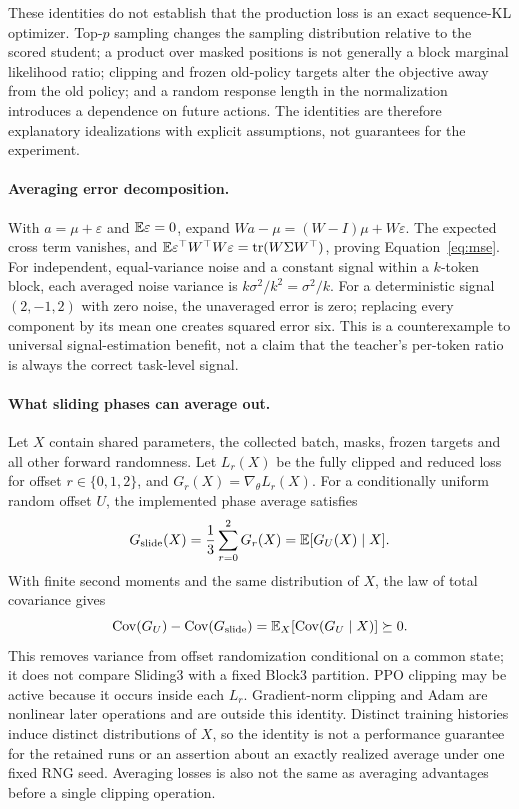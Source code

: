 These identities do not establish that the production loss is an exact sequence-KL optimizer. Top-$p$ sampling changes the sampling distribution relative to the scored student; a product over masked positions is not generally a block marginal likelihood ratio; clipping and frozen old-policy targets alter the objective away from the old policy; and a random response length in the normalization introduces a dependence on future actions. The identities are therefore explanatory idealizations with explicit assumptions, not guarantees for the experiment.

\paragraph{Averaging error decomposition.}
With $a=\mu+\varepsilon$ and $\mathbb{E}\varepsilon=0$, expand $Wa-\mu=(W-I)\mu+W\varepsilon$.
The expected cross term vanishes, and $\mathbb{E}\varepsilon^\top W^\top W\varepsilon=\operatorname{tr}(W\Sigma W^\top)$, proving Equation~\ref{eq:mse}.
For independent, equal-variance noise and a constant signal within a $k$-token block, each averaged noise variance is $k\sigma^2/k^2=\sigma^2/k$.
For a deterministic signal $(2,-1,2)$ with zero noise, the unaveraged error is zero; replacing every component by its mean one creates squared error six. This is a counterexample to universal signal-estimation benefit, not a claim that the teacher's per-token ratio is always the correct task-level signal.

\paragraph{What sliding phases can average out.}
Let $X$ contain shared parameters, the collected batch, masks, frozen targets and all other forward randomness. Let $L_r(X)$ be the fully clipped and reduced loss for offset $r\in\{0,1,2\}$, and $G_r(X)=\nabla_\theta L_r(X)$. For a conditionally uniform random offset $U$, the implemented phase average satisfies
\begin{equation}
 G_{\mathrm{slide}}(X)=\frac13\sum_{r=0}^2G_r(X)
 =\mathbb{E}[G_U(X)\mid X].
\end{equation}
With finite second moments and the same distribution of $X$, the law of total covariance gives
\begin{equation}
 \operatorname{Cov}(G_U)-\operatorname{Cov}(G_{\mathrm{slide}})
 =\mathbb{E}_X[\operatorname{Cov}(G_U\mid X)]\succeq0.
 \label{eq:phasecov}
\end{equation}
This removes variance from offset randomization conditional on a common state; it does not compare Sliding3 with a fixed Block3 partition. PPO clipping may be active because it occurs inside each $L_r$. Gradient-norm clipping and Adam are nonlinear later operations and are outside this identity. Distinct training histories induce distinct distributions of $X$, so the identity is not a performance guarantee for the retained runs or an assertion about an exactly realized average under one fixed RNG seed. Averaging losses is also not the same as averaging advantages before a single clipping operation.

